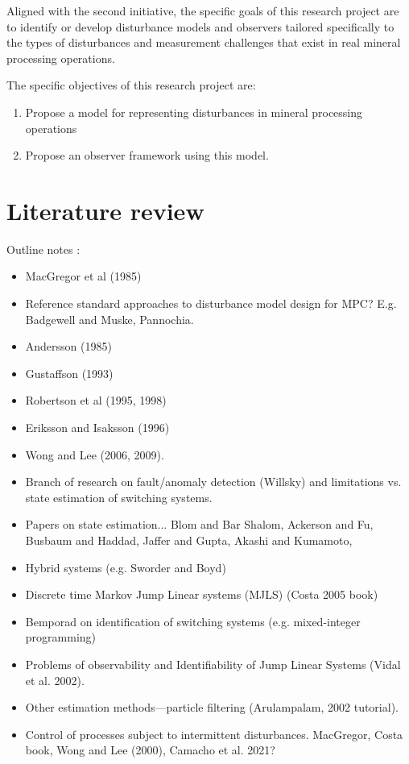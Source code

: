 Aligned with the second initiative, the specific goals of this research project are to identify or develop disturbance models and observers tailored specifically to the types of disturbances and measurement challenges that exist in real mineral processing operations.

The specific objectives of this research project are:

\begin{enumerate}
	\item Propose a model for representing disturbances in mineral processing operations
	\item Propose an observer framework using this model.
\end{enumerate}

\section*{Literature review}

Outline notes :

\begin{itemize}
	\item MacGregor et al (1985)
	\item Reference standard approaches to disturbance model design for MPC?  E.g. Badgewell and Muske, Pannochia.
	\item Andersson (1985)
	\item Gustaffson (1993)
	\item Robertson et al (1995, 1998)
	\item Eriksson and Isaksson (1996)
	\item Wong and Lee (2006, 2009).
	\item Branch of research on fault/anomaly detection (Willsky) and limitations vs. state estimation of switching systems.
	\item Papers on state estimation... Blom and Bar Shalom, Ackerson and Fu, Busbaum and Haddad, Jaffer and Gupta, Akashi and Kumamoto,
	\item Hybrid systems (e.g. Sworder and Boyd)
	\item Discrete time Markov Jump Linear systems (MJLS) (Costa 2005 book)
	\item Bemporad on identification of switching systems (e.g. mixed-integer programming)
	\item Problems of observability and Identifiability of Jump Linear Systems (Vidal et al. 2002).
	\item Other estimation methods—particle filtering (Arulampalam, 2002 tutorial).
	\item Control of processes subject to intermittent disturbances. MacGregor, Costa book, Wong and Lee (2000), Camacho et al. 2021?
\end{itemize}

